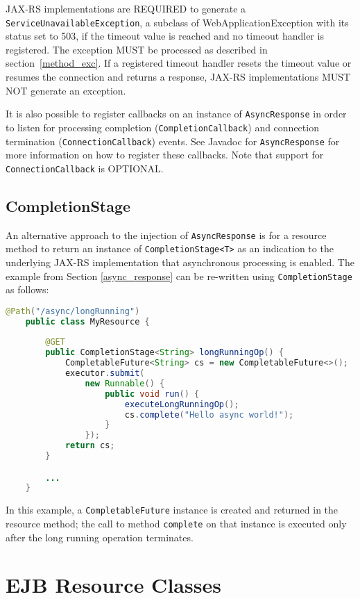 JAX-RS implementations are REQUIRED to generate a \lstinline{ServiceUnavailableException}, a subclass of
WebApplicationException with its status set to 503, if the timeout value is reached and no timeout handler is
registered. The exception MUST be processed as described in section~\ref{method_exc}. If a registered timeout handler
resets the timeout value or resumes the connection and returns a response, JAX-RS implementations MUST NOT generate an
exception.

It is also possible to register callbacks on an instance of \lstinline{AsyncResponse} in order to listen for processing
completion (\lstinline{CompletionCallback}) and connection termination (\lstinline{ConnectionCallback}) events. See
Javadoc for \lstinline{AsyncResponse} for more information on how to register these callbacks. Note that support for
\lstinline{ConnectionCallback} is OPTIONAL.

\subsection{CompletionStage}
\label{completionstage}

An alternative approach to the injection of \lstinline{AsyncResponse} is for a resource method to return an instance of
\lstinline{CompletionStage<T>} as an indication to the underlying JAX-RS implementation that asynchronous processing is
enabled. The example from Section \ref{async_response} can be re-written using \lstinline{CompletionStage} as follows:

\begin{lstlisting}[language=Java]
	@Path("/async/longRunning")
	public class MyResource {
		
		@GET
		public CompletionStage<String> longRunningOp() {
			CompletableFuture<String> cs = new CompletableFuture<>();
			executor.submit(
			    new Runnable() {
				    public void run() {
					    executeLongRunningOp();
					    cs.complete("Hello async world!");
		  	        } 
	  	        });
	  	    return cs;
		}

		...
	}
\end{lstlisting}

In this example, a \lstinline{CompletableFuture} instance is created and returned in the resource method; the call to
method \lstinline{complete} on that instance is executed only after the long running operation terminates.

\section{EJB Resource Classes}
\label{async_ejbs}

